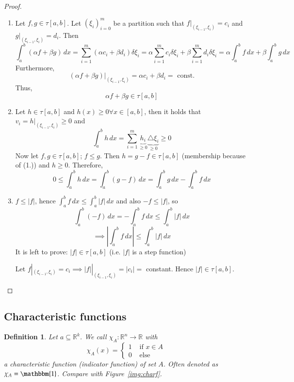 \documentclass{article}
\newtheorem{definition}{Definition}  \numberwithin{definition}{section}
\newcommand{\card}[1]{\left|#1\right|}
\begin{document}
\begin{proof}
  \begin{enumerate}
    \item
      Let $f,g \in \tau[a,b]$. Let $(\xi_i)_{i=0}^m$ be a partition such that
      $f|_{(\xi_{i-1},\xi_i)} = c_i$ and $g|_{(\xi_{i-1},\xi_i)} = d_i$.
      Then
      \[
        \int_a^b (\alpha f + \beta g) \, dx = \sum_{i=1}^m (\alpha c_i + \beta d_i) \delta \xi_i
        = \alpha \sum_{i=1}^m c_i \delta \xi_i + \beta \sum_{i=1}^m d_i \delta \xi_i
        = \alpha \int_a^b f \, dx + \beta \int_a^b g \, dx
      \]
      Furthermore,
      \[ (\alpha f + \beta g)|_{(\xi_{i-1},\xi_i)} = \alpha c_i + \beta d_i = \text{ const.} \]
      Thus,
      \[ \alpha f + \beta g \in \tau[a,b] \]
    \item
      Let $h \in \tau[a,b]$ and $h(x) \geq 0 \forall x \in [a,b]$,
      then it holds that $v_i = h|_{(\xi_{i-1}, \xi_i)} \geq 0$ and
      \[ \int_a^b h \, dx = \sum_{i=1}^m \underbrace{h_i}_{\geq 0} \underbrace{\triangle \xi_i}_{\geq 0} \geq 0 \]
      Now let $f, g \in \tau[a,b]$; $f \leq g$. Then $h = g - f \in \tau[a,b]$ (membership because of (1.)) and $h \geq 0$.
      Therefore,
      \[ 0 \leq \int_a^b h \, dx = \int_a^b (g - f) \, dx = \int_a^b g \, dx - \int_a^b f \, dx \]
    \item
      $f \leq \card{f}$, hence $\int_a^b f \, dx \leq \int_a^b \card{f} \, dx$ and also
      $-f \leq \card{f}$, so
      \[ \int_a^b (-f) \, dx = -\int_a^b f \, dx \leq \int_a^b \card{f} \, dx \]
      \[ \implies \card{\int_a^b f \, dx} \leq \int_a^b \card{f} \, dx \]
      It is left to prove: $\card{f} \in \tau[a,b]$ (i.e. $\card{f}$ is a step function)

      Let $f|_{(\xi_{i-1}, \xi_i)} = c_i \implies \card{f}|_{(\xi_{i-1}, \xi_i)} = \card{c_i} = $ constant.
      Hence $\card{f} \in \tau[a,b]$.
  \end{enumerate}
\end{proof}

\subsection{Characteristic functions}

\begin{definition} %
  Let $a \subseteq \mathbb R^k$. We call $\chi_A: \mathbb R^n \to \mathbb R$ with
  \[
    \chi_A(x) = \begin{cases}
      1 & \text{ if } x \in A \\
      0 & \text{ else}
    \end{cases}
  \]
  a \emph{characteristic function} (indicator function) of set $A$.
  Often denoted as $\chi_A = \mathbbm{1}$. Compare with Figure~\ref{img:charf}.
\end{definition}
\end{document}

